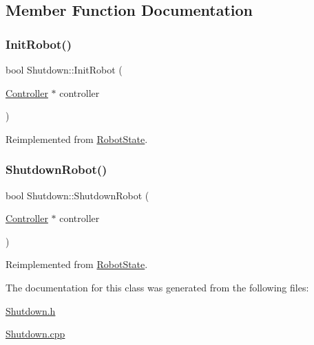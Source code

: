 \subsection{Member Function Documentation}
\mbox{\label{class_shutdown_a56ba69711c5d716717ce511f6ab3ec99}} 
\subsubsection{\texorpdfstring{InitRobot()}{InitRobot()}}
{\footnotesize\ttfamily bool Shutdown\+::\+Init\+Robot (\begin{DoxyParamCaption}\item[{\mbox{\hyperlink{class_controller}{Controller}} $\ast$}]{controller }\end{DoxyParamCaption})\hspace{0.3cm}{\ttfamily [virtual]}}



Reimplemented from \mbox{\hyperlink{class_robot_state_a5087ea1ba96b9aad623fe52bbb249b41}{Robot\+State}}.

\mbox{\label{class_shutdown_ac3e8449d327804a47d82f8d84c3d99b4}} 
\subsubsection{\texorpdfstring{ShutdownRobot()}{ShutdownRobot()}}
{\footnotesize\ttfamily bool Shutdown\+::\+Shutdown\+Robot (\begin{DoxyParamCaption}\item[{\mbox{\hyperlink{class_controller}{Controller}} $\ast$}]{controller }\end{DoxyParamCaption})\hspace{0.3cm}{\ttfamily [virtual]}}



Reimplemented from \mbox{\hyperlink{class_robot_state_a9f2cd6a7ec1022e85d6ac160c6f75e54}{Robot\+State}}.



The documentation for this class was generated from the following files\+:\begin{DoxyCompactItemize}
\item 
\mbox{\hyperlink{_shutdown_8h}{Shutdown.\+h}}\item 
\mbox{\hyperlink{_shutdown_8cpp}{Shutdown.\+cpp}}\end{DoxyCompactItemize}
